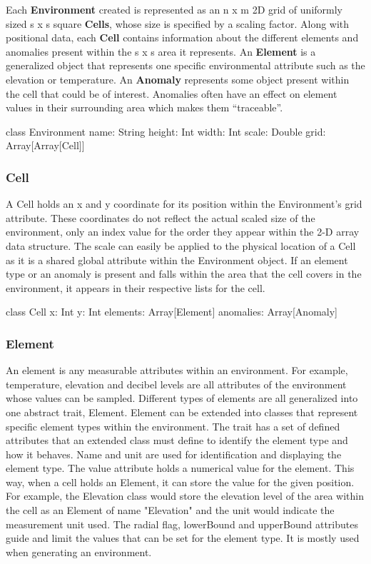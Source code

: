 Each \textbf{Environment} created is represented as an n x m 2D grid of uniformly sized s x s square \textbf{Cells}, whose size is specified by a scaling factor.
Along with positional data, each \textbf{Cell} contains information about the different elements and anomalies present within the s x s area it represents.
An \textbf{Element} is a generalized object that represents one specific environmental attribute such as the elevation or temperature.
An \textbf{Anomaly} represents some object present within the cell that could be of interest.
Anomalies often have an effect on element values in their surrounding area which makes them “traceable”.

class Environment {
	name: String
  height: Int
  width: Int
  scale: Double
	grid: Array[Array[Cell]]
}

\subsubsection{Cell}
A Cell holds an x and y coordinate for its position within the Environment's grid attribute.
These coordinates do not reflect the actual scaled size of the environment, only an index value for the order they appear within the 2-D array data structure.
The scale can easily be applied to the physical location of a Cell as it is a shared global attribute within the Environment object.
If an element type or an anomaly is present and falls within the area that the cell covers in the environment, it appears in their respective lists for the cell.

class Cell {
  x: Int
  y: Int
  elements: Array[Element]
  anomalies: Array[Anomaly]
}

\subsubsection{Element}
An element is any measurable attributes within an environment.
For example, temperature, elevation and decibel levels are all attributes of the environment whose values can be sampled.
Different types of elements are all generalized into one abstract trait, Element.
Element can be extended into classes that represent specific element types within the environment.
The trait has a set of defined attributes that an extended class must define to identify the element type and how it behaves.
Name and unit are used for identification and displaying the element type.
The value attribute holds a numerical value for the element.
This way, when a cell holds an Element, it can store the value for the given position.
For example, the Elevation class would store the elevation level of the area within the cell as an Element of name "Elevation" and the unit would indicate the measurement unit used.
The radial flag, lowerBound and upperBound attributes guide and limit the values that can be set for the element type.
It is mostly used when generating an environment. 


